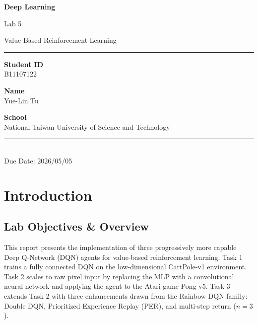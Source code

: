\documentclass[12pt, a4paper]{report}
\title{}
\date{}
\begin{document}
\begin{titlepage}
\centering
\vspace*{3cm}
{\LARGE\bfseries Deep Learning\par}
\vspace{0.5em}
{\Large Lab 5\par}
\vspace{0.5em}
{\large Value-Based Reinforcement Learning\par}

\vspace{1cm}
\rule{0.6\linewidth}{0.8pt}

\vspace{2cm}
{\large\textbf{Student ID}\\[0.3em] B11107122\par}

\vspace{1em}
{\large\textbf{Name}\\[0.3em] Yue-Lin Tu
\par}

\vspace{1em}
{\large\textbf{School}\\[0.3em] National Taiwan University of Science and Technology\par}

\vfill
\rule{0.6\linewidth}{0.8pt}\\[0.5em]
{\small Due Date: 2026/05/05}
\end{titlepage}

\tableofcontents
\clearpage

\chapter{Introduction}

\section*{Lab Objectives \& Overview}

This report presents the implementation of three progressively more capable Deep Q-Network (DQN) agents
for value-based reinforcement learning. Task 1 trains a fully connected DQN on the low-dimensional
CartPole-v1 environment. Task 2 scales to raw pixel input by replacing the MLP with a convolutional
neural network and applying the agent to the Atari game Pong-v5. Task 3 extends Task 2 with three
enhancements drawn from the Rainbow DQN family: Double DQN, Prioritized Experience Replay (PER),
and multi-step return ($n=3$).
\end{document}
